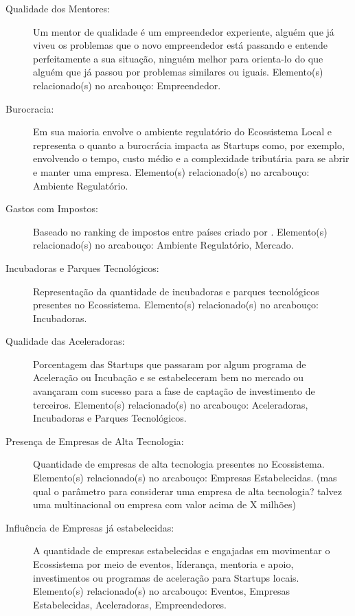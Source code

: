 \begin{description}
  \item [Qualidade dos Mentores:] Um mentor de qualidade é um empreendedor experiente, alguém que já viveu os problemas que o novo empreendedor está passando e entende perfeitamente a sua situação, ninguém melhor para orienta-lo do que alguém que já passou por problemas similares ou iguais. Elemento(s) relacionado(s) no arcabouço: Empreendedor.

  \item [Burocracia:] Em sua maioria envolve o ambiente regulatório do Ecossistema Local e representa o quanto a burocrácia impacta as Startups como, por exemplo, envolvendo o tempo, custo médio e a complexidade tributária para se abrir e manter uma empresa. Elemento(s) relacionado(s) no arcabouço: Ambiente Regulatório.

  \item [Gastos com Impostos:] Baseado no ranking de impostos entre países criado por . Elemento(s) relacionado(s) no arcabouço: Ambiente Regulatório, Mercado. 

  \item [Incubadoras e Parques Tecnológicos:] Representação da quantidade de incubadoras e parques tecnológicos presentes no Ecossistema. Elemento(s) relacionado(s) no arcabouço: Incubadoras.

  \item [Qualidade das Aceleradoras:] Porcentagem das Startups que passaram por algum programa de Aceleração ou Incubação e se estabeleceram bem no mercado ou avançaram com sucesso para a fase de captação de investimento de terceiros. Elemento(s) relacionado(s) no arcabouço: Aceleradoras, Incubadoras e Parques Tecnológicos.

  \item [Presença de Empresas de Alta Tecnologia:] Quantidade de empresas de alta tecnologia presentes no Ecossistema. Elemento(s) relacionado(s) no arcabouço: Empresas Estabelecidas. (mas qual o parâmetro para considerar uma empresa de alta tecnologia? talvez uma multinacional ou empresa com valor acima de X milhões)

  \item [Influência de Empresas já estabelecidas:] A quantidade de empresas estabelecidas e engajadas em movimentar o Ecossistema por meio de eventos, líderança, mentoria e apoio, investimentos ou programas de aceleração para Startups locais. Elemento(s) relacionado(s) no arcabouço: Eventos, Empresas Estabelecidas, Aceleradoras, Empreendedores.


\end{description}
